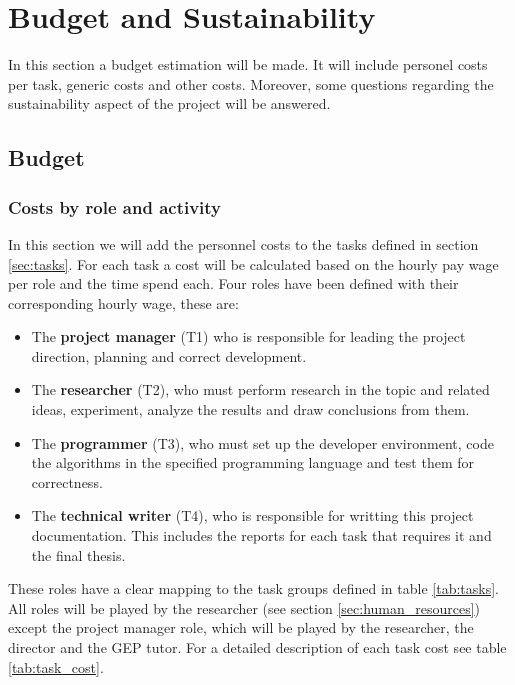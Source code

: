 
\chapter{Budget and Sustainability} %
\label{Chapter3}

In this section a budget estimation will be made. It will include personel costs per task, generic costs and other costs. Moreover, some questions regarding the sustainability aspect of the project will be answered.

\section{Budget}

\subsection{Costs by role and activity}

In this section we will add the personnel costs to the tasks defined in section \ref{sec:tasks}. For each task a cost will be calculated based on the hourly pay wage per role and the time spend each. Four roles have been defined with their corresponding hourly wage, these are:

\begin{itemize}
    \item The \textbf{project manager} (T1) who is responsible for leading the project direction, planning and correct development.
    \item The \textbf{researcher} (T2), who must perform research in the topic and related ideas, experiment, analyze the results and draw conclusions from them.
    \item The \textbf{programmer} (T3), who must set up the developer environment, code the algorithms in the specified programming language and test them for cor\-rect\-ness.
    \item The \textbf{technical writer} (T4), who is responsible for writting this project doc\-u\-men\-ta\-tion. This includes the reports for each task that requires it and the final thesis.
\end{itemize}

These roles have a clear mapping to the task groups defined in table \ref{tab:tasks}. All roles will be played by the researcher (see section \ref{sec:human_resources}) except the project manager role, which will be played by the researcher, the director and the GEP tutor. For a detailed description of each task cost see table \ref{tab:task_cost}.

